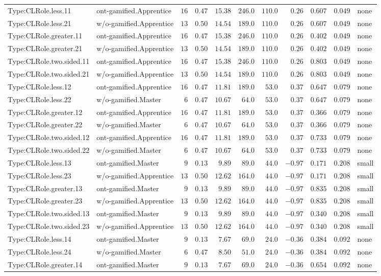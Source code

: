 \documentclass[6pt,a4paper]{article}
\begin{document}
{\begin{longtable}{llrrrrrrrrl}
Type:CLRole.less.11&ont-gamified.Apprentice&$16$&$0.47$&$15.38$&$246.0$&$110.0$&$ 0.26$&$0.607$&$0.049$&none\tabularnewline
Type:CLRole.less.21&w/o-gamified.Apprentice&$13$&$0.50$&$14.54$&$189.0$&$110.0$&$ 0.26$&$0.607$&$0.049$&none\tabularnewline
Type:CLRole.greater.11&ont-gamified.Apprentice&$16$&$0.47$&$15.38$&$246.0$&$110.0$&$ 0.26$&$0.402$&$0.049$&none\tabularnewline
Type:CLRole.greater.21&w/o-gamified.Apprentice&$13$&$0.50$&$14.54$&$189.0$&$110.0$&$ 0.26$&$0.402$&$0.049$&none\tabularnewline
Type:CLRole.two.sided.11&ont-gamified.Apprentice&$16$&$0.47$&$15.38$&$246.0$&$110.0$&$ 0.26$&$0.803$&$0.049$&none\tabularnewline
Type:CLRole.two.sided.21&w/o-gamified.Apprentice&$13$&$0.50$&$14.54$&$189.0$&$110.0$&$ 0.26$&$0.803$&$0.049$&none\tabularnewline
Type:CLRole.less.12&ont-gamified.Apprentice&$16$&$0.47$&$11.81$&$189.0$&$ 53.0$&$ 0.37$&$0.647$&$0.079$&none\tabularnewline
Type:CLRole.less.22&w/o-gamified.Master&$ 6$&$0.47$&$10.67$&$ 64.0$&$ 53.0$&$ 0.37$&$0.647$&$0.079$&none\tabularnewline
Type:CLRole.greater.12&ont-gamified.Apprentice&$16$&$0.47$&$11.81$&$189.0$&$ 53.0$&$ 0.37$&$0.366$&$0.079$&none\tabularnewline
Type:CLRole.greater.22&w/o-gamified.Master&$ 6$&$0.47$&$10.67$&$ 64.0$&$ 53.0$&$ 0.37$&$0.366$&$0.079$&none\tabularnewline
Type:CLRole.two.sided.12&ont-gamified.Apprentice&$16$&$0.47$&$11.81$&$189.0$&$ 53.0$&$ 0.37$&$0.733$&$0.079$&none\tabularnewline
Type:CLRole.two.sided.22&w/o-gamified.Master&$ 6$&$0.47$&$10.67$&$ 64.0$&$ 53.0$&$ 0.37$&$0.733$&$0.079$&none\tabularnewline
Type:CLRole.less.13&ont-gamified.Master&$ 9$&$0.13$&$ 9.89$&$ 89.0$&$ 44.0$&$-0.97$&$0.171$&$0.208$&small\tabularnewline
Type:CLRole.less.23&w/o-gamified.Apprentice&$13$&$0.50$&$12.62$&$164.0$&$ 44.0$&$-0.97$&$0.171$&$0.208$&small\tabularnewline
Type:CLRole.greater.13&ont-gamified.Master&$ 9$&$0.13$&$ 9.89$&$ 89.0$&$ 44.0$&$-0.97$&$0.835$&$0.208$&small\tabularnewline
Type:CLRole.greater.23&w/o-gamified.Apprentice&$13$&$0.50$&$12.62$&$164.0$&$ 44.0$&$-0.97$&$0.835$&$0.208$&small\tabularnewline
Type:CLRole.two.sided.13&ont-gamified.Master&$ 9$&$0.13$&$ 9.89$&$ 89.0$&$ 44.0$&$-0.97$&$0.340$&$0.208$&small\tabularnewline
Type:CLRole.two.sided.23&w/o-gamified.Apprentice&$13$&$0.50$&$12.62$&$164.0$&$ 44.0$&$-0.97$&$0.340$&$0.208$&small\tabularnewline
Type:CLRole.less.14&ont-gamified.Master&$ 9$&$0.13$&$ 7.67$&$ 69.0$&$ 24.0$&$-0.36$&$0.384$&$0.092$&none\tabularnewline
Type:CLRole.less.24&w/o-gamified.Master&$ 6$&$0.47$&$ 8.50$&$ 51.0$&$ 24.0$&$-0.36$&$0.384$&$0.092$&none\tabularnewline
Type:CLRole.greater.14&ont-gamified.Master&$ 9$&$0.13$&$ 7.67$&$ 69.0$&$ 24.0$&$-0.36$&$0.654$&$0.092$&none\tabularnewline

\end{longtable}}
\end{document}
